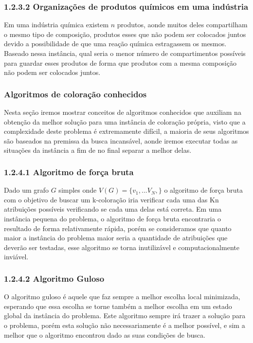 \documentclass[12pt]{article}
\begin{document}
	
	\subsubsection*{   1.2.3.2 Organizações de produtos químicos em uma indústria}
	
	Em uma indústria química existem $n$ produtos, aonde muitos deles compartilham o mesmo tipo de composição, produtos esses que não podem ser colocados juntos devido a possibilidade de que uma reação química estragassem os mesmos. Baseado nessa instância, qual seria o menor número de compartimentos possíveis para guardar esses produtos de forma que produtos com a mesma composição não podem ser colocados juntos.
	
	\subsubsection{Algoritmos de coloração conhecidos}
	
	Nesta seção iremos mostrar conceitos de algoritmos conhecidos que auxiliam na obtenção da melhor solução para uma instância de coloração própria, visto que a complexidade deste problema é extremamente difícil, a maioria de seus algoritmos são baseados na premissa da busca incansável, aonde iremos executar todas as situações da instância a fim de no final separar a melhor delas.
	
	\subsubsection*{1.2.4.1 Algoritmo de força bruta}
	Dado um grafo $G$ simples onde $V(G) = \{v_{1}, ... V_{N},\}$ o algoritmo de força bruta com o objetivo de buscar um k-coloração iria verificar cada uma das Kn atribuições possíveis verificando se cada uma delas está correta. Em uma instância pequena do problema, o algoritmo de força bruta encontraria o resultado de forma relativamente rápida, porém se consideramos que quanto maior a instância do problema maior seria a quantidade de atribuições que deverão ser testadas, esse algoritmo se torna inutilizável e computacionalmente inviável.
	
	\subsubsection*{1.2.4.2 Algoritmo Guloso}
	
	O algoritmo guloso é aquele que faz sempre a melhor escolha local minimizada, esperando que essa escolha se torne também a melhor escolha em um estado global da instância do problema.
	Este algoritmo sempre irá trazer a solução para o problema, porém esta solução não necessariamente é a melhor possível, e sim a melhor que o algoritmo encontrou dado as suas condições de busca.
	
\end{document}
